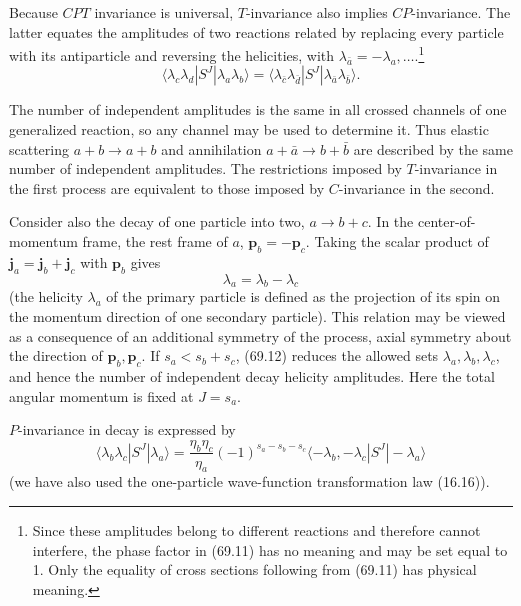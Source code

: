 Because $CPT$ invariance is universal, $T$-invariance also implies $CP$-invariance. The latter equates the amplitudes of two reactions related by replacing every particle with its antiparticle and reversing the helicities, with $\lambda_{\bar a}=-\lambda_a,\ldots$.\footnote{Since these amplitudes belong to different reactions and therefore cannot interfere, the phase factor in (69.11) has no meaning and may be set equal to 1. Only the equality of cross sections following from (69.11) has physical meaning.}
\begin{equation}
\langle\lambda_c\lambda_d|S^J|\lambda_a\lambda_b\rangle
=\langle\lambda_{\bar c}\lambda_{\bar d}|S^J|\lambda_{\bar a}\lambda_{\bar b}\rangle.
\tag{69.11}
\end{equation}

The number of independent amplitudes is the same in all crossed channels of one generalized reaction, so any channel may be used to determine it. Thus elastic scattering $a+b\to a+b$ and annihilation $a+\bar a\to b+\bar b$ are described by the same number of independent amplitudes. The restrictions imposed by $T$-invariance in the first process are equivalent to those imposed by $C$-invariance in the second.

Consider also the decay of one particle into two, $a\to b+c$. In the center-of-momentum frame, the rest frame of $a$, $\mathbf p_b=-\mathbf p_c$. Taking the scalar product of $\mathbf j_a=\mathbf j_b+\mathbf j_c$ with $\mathbf p_b$ gives
\begin{equation}
\lambda_a=\lambda_b-\lambda_c
\tag{69.12}
\end{equation}
(the helicity $\lambda_a$ of the primary particle is defined as the projection of its spin on the momentum direction of one secondary particle). This relation may be viewed as a consequence of an additional symmetry of the process, axial symmetry about the direction of $\mathbf p_b,\mathbf p_c$. If $s_a<s_b+s_c$, (69.12) reduces the allowed sets $\lambda_a,\lambda_b,\lambda_c$, and hence the number of independent decay helicity amplitudes. Here the total angular momentum is fixed at $J=s_a$.

$P$-invariance in decay is expressed by
\begin{equation}
\langle\lambda_b\lambda_c|S^J|\lambda_a\rangle
=\frac{\eta_b\eta_c}{\eta_a}(-1)^{s_a-s_b-s_c}
\langle-\lambda_b,-\lambda_c|S^J|-\lambda_a\rangle
\tag{69.13}
\end{equation}
(we have also used the one-particle wave-function transformation law (16.16)).

